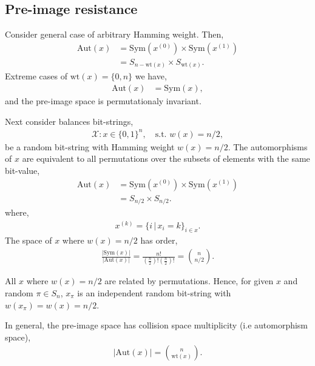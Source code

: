 \documentclass[twocolumn, aps, amsmath, amssymb, nofootinbib, superscriptaddress, longbibliography, doublefloatfix, table-of-contents, eqsecnum, rmp]{revtex4-2}
\def\symbraid#1{\langle#1\rangle_{\pi}^{\pi^{-1}}}
\begin{document}

\subsection{Pre-image resistance}

Consider general case of arbitrary Hamming weight. Then,
\begin{align}
	\mathrm{Aut}(x) &= \mathrm{Sym}(x^{(0)}) \times \mathrm{Sym}(x^{(1)}) \nonumber\\
	&= S_{n-\mathrm{wt}(x)}\times S_{\mathrm{wt}(x)}.
\end{align}
Extreme cases of $\mathrm{wt}(x)=\{0,n\}$ we have,
\begin{align}
	\mathrm{Aut}(x) &= \mathrm{Sym}(x),
\end{align}
and the pre-image space is permutationaly invariant.

Next consider balances bit-strings,
\begin{align}
	\mathcal{X}: x\in\{0,1\}^n,\quad \mathrm{s.t.}\,\,w(x)=n/2,
\end{align}
be a random bit-string with Hamming weight \mbox{$w(x)=n/2$}. The automorphisms of $x$ are equivalent to all permutations over the subsets of elements with the same bit-value,
\begin{align}
	\mathrm{Aut}(x) &= \mathrm{Sym}(x^{(0)}) \times \mathrm{Sym}(x^{(1)}) \nonumber\\
	&= S_{n/2}\times S_{n/2}.
\end{align}
where,
\begin{align}
	x^{(k)}=\{i\,|\, x_i=k\}_{i\in x}.
\end{align}
The space of $x$ where $w(x)=n/2$ has order,
\begin{align}
	\frac{|\mathrm{Sym}(x)|}{|\mathrm{Aut}(x)|} = \frac{n!}{(\frac{n}{2})!(\frac{n}{2})!} = \binom{n}{n/2}.
\end{align}

All $x$ where $w(x)=n/2$ are related by permutations. Hence, for given $x$ and random $\pi\in S_n$, $x_\pi$ is an independent random bit-string with $w(x_\pi)=w(x)=n/2$.

In general, the pre-image space has collision space multiplicity (i.e automorphism space),
\begin{align}
	|\mathrm{Aut}(x)| = \binom{n}{\mathrm{wt}(x)}.
\end{align}
\end{document}
